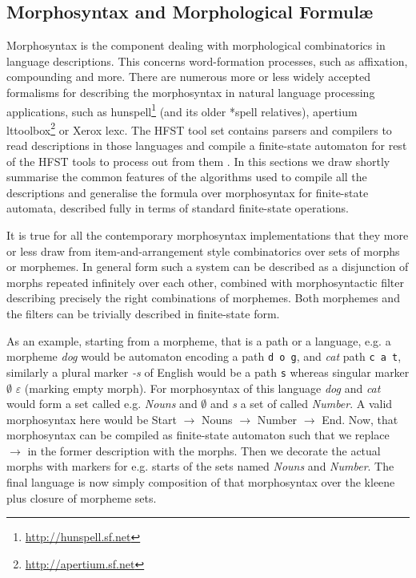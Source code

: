 \documentclass{llncs}
\begin{document}
\subsection{Morphosyntax and Morphological Formul\ae}

Morphosyntax is the component dealing with morphological combinatorics in
language descriptions. This concerns word-formation processes, such as
affixation, compounding and more. There are numerous more or less widely
accepted formalisms for describing the morphosyntax in natural language
processing applications, such as
hunspell\footnote{\url{http://hunspell.sf.net}} (and its older *spell
relatives), apertium lttoolbox\footnote{\url{http://apertium.sf.net}} or Xerox
lexc\cite{beesley/2003}. The HFST tool set contains parsers and compilers to
read descriptions in those languages and compile a finite-state automaton for
rest of the HFST tools to process out from them
\cite{pirinen/il/2010,pirinene/2009/sfcm,pirinen/2012/lrec}. In this sections
we draw shortly summarise the common features of the algorithms used to compile
all the descriptions and generalise the formula over morphosyntax for
finite-state automata, described fully in terms of standard finite-state
operations.

It is true for all the contemporary morphosyntax implementations that they more
or less draw from item-and-arrangement style combinatorics over sets of
morphs or morphemes. In general form such a system can be described as a
disjunction of morphs repeated infinitely over each other, combined with
morphosyntactic filter describing precisely the right combinations of morphemes.
Both morphemes and the filters can be trivially described in finite-state form.

As an example, starting from a morpheme, that is a path or a language, e.g.  a
morpheme \emph{dog} would be automaton encoding a path \texttt{d o g}, and
\emph{cat} path \texttt{c a t}, similarly a plural marker \emph{-s} of English
would be a path \texttt{s} whereas singular marker \emph{$\emptyset$}
\texttt{$\varepsilon$} (marking empty morph). For morphosyntax of this language
\emph{dog} and \emph{cat} would form a set called e.g. \emph{Nouns} and
\emph{$\emptyset$} and \emph{s} a set of called \emph{Number}. A valid
morphosyntax here would be Start $\rightarrow$ Nouns $\rightarrow$ Number
$\rightarrow$ End. Now, that morphosyntax can be compiled as finite-state
automaton such that we replace $\rightarrow$ in the former description with the
morphs. Then we decorate the actual morphs with markers for e.g. starts of the
sets named \emph{Nouns} and \emph{Number}. The final language is now simply
composition of that morphosyntax over the kleene plus closure of morpheme sets.
\end{document}
